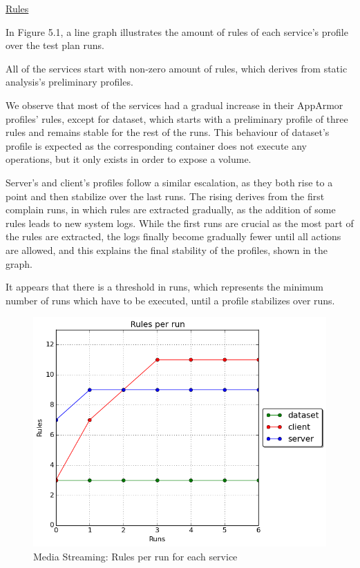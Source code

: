 \underline{Rules}

In Figure 5.1, a line graph illustrates the amount of rules of each service's profile over the test plan runs.

All of the services start with non-zero amount of rules, which derives from static analysis's preliminary profiles.

We observe that most of the services had a gradual increase in their AppArmor profiles' rules, except for dataset, which starts with a preliminary profile of three rules and remains stable for the rest of the runs. This behaviour of dataset's profile is expected as the corresponding container does not execute any operations, but it only exists in order to expose a volume.

Server's and client's profiles follow a similar escalation, as they both rise to a point and then stabilize over the last runs. The rising derives from the first complain runs, in which rules are extracted gradually, as the addition of some rules leads to new system logs. While the first runs are crucial as the most part of the rules are extracted, the logs finally become gradually fewer until all actions are allowed, and this explains the final stability of the profiles, shown in the graph.

It appears that there is a threshold in runs, which represents the minimum number of runs which have to be executed, until a profile stabilizes over runs.

\begin{figure}[h!]
  \centering
   \includegraphics[width=0.85\linewidth]{./figures/mediastreaming/plots_with_grid/rules.png}
   \caption{Media Streaming: Rules per run for each service}
\end{figure}

